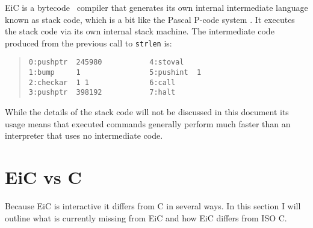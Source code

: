 EiC is a bytecode~\cite{budd87} compiler
that generates its own internal intermediate language known as stack code,
 which is a bit like the Pascal P-code system
\cite{pemberton-daniels82}. It executes the stack code via its own internal 
stack machine.  The intermediate code produced
from the previous call to {\tt strlen} is:

\small
\begin{quote}
\begin{verbatim}
0:pushptr  245980           4:stoval                            
1:bump     1                5:pushint  1          
2:checkar  1 1              6:call                
3:pushptr  398192           7:halt                
\end{verbatim}
\end{quote}
\normalsize


While the details of the stack code will not be discussed in this
document its usage means that executed commands generally perform much
faster than an interpreter that uses no intermediate code.

\section{\label{sec:EiCvsC} EiC vs C}

Because EiC is interactive it differs from C in several
ways. In this section I will outline what is currently
missing from EiC and how EiC differs from ISO C. 

